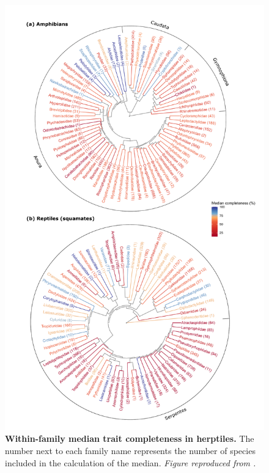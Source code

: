 \clearpage

\begin{figure}[h!]
\centering
\includegraphics[scale=0.5]{figures/Chapter1/Figure_3}
\caption[Within-family median trait completeness in herptiles.]{\textbf{Within-family median trait completeness in herptiles.} The number next to each family name represents the number of species included in the calculation of the median. \textit{Figure reproduced from \citet{Etard2020}.}}
\label{1_Phylo}
\end{figure}

\clearpage


